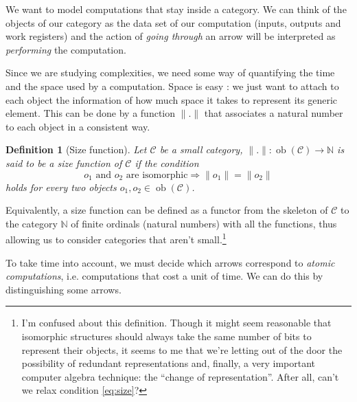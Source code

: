 \documentclass{article}
\newcommand{\cat}[1]{\mathscr{#1}}
\newcommand{\C}{\cat{C}}
\newcommand{\size}[1]{\lVert#1\rVert}
\DeclareMathOperator{\ob}{ob}
\newcommand{\N}{\mathbb{N}}
\newtheorem{definition}{Definition}
\begin{document}
  We want to model computations that stay inside a category. We can
  think of the objects of our category as the data set of our
  computation (inputs, outputs and work registers) and the action of
  \emph{going through} an arrow will be interpreted as
  \emph{performing} the computation.
  
  Since we are studying complexities, we need some way of quantifying
  the time and the space used by a computation. Space is easy : we
  just want to attach to each object the information of how much space
  it takes to represent its generic element. This can be done by a
  function $\size{.}$ that associates a natural number to each object
  in a consistent way.

  \begin{definition}[Size function]
    Let $\C$ be a small category, $\size{.} : \ob(\C) \rightarrow \N$ is
    said to be a \emph{size function} of $\C$ if the condition
    \begin{equation}
      \label{eq:size}
      o_1 \text{ and } o_2 \text{ are isomorphic}
      \Rightarrow \size{o_1} = \size{o_2}
    \end{equation}
    holds for every two objects $o_1,o_2\in\ob(\C)$.
  \end{definition}
  
  Equivalently, a size function can be defined as a functor from the
  skeleton of $\C$ to the category $\N$ of finite ordinals (natural
  numbers) with all the functions, thus allowing us to consider
  categories that aren't small.\footnote{I'm confused about this
  definition. Though it might seem reasonable that isomorphic
  structures should always take the same number of bits to represent
  their objects, it seems to me that we're letting out of the door the
  possibility of redundant representations and, finally, a very
  important computer algebra technique: the ``change of
  representation''. After all, can't we relax condition
  \eqref{eq:size}?}

  To take time into account, we must decide which arrows correspond to
  \emph{atomic computations}, i.e. computations that cost a unit of
  time. We can do this by distinguishing some arrows.
\end{document}
